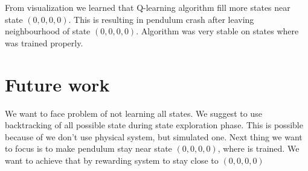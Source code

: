 \documentclass[12pt,a4paper]{article}
\begin{document}
From visualization we learned that Q-learning algorithm fill more states near state $(0, 0, 0, 0)$. This is resulting in pendulum crash after leaving neighbourhood of state $(0, 0, 0, 0)$. Algorithm was very stable on states where was trained properly. 


\section{Future work}

We want to face problem of not learning all states. We suggest to use backtracking of all possible state during state exploration phase. This is possible because of we don't use physical system, but simulated one. Next thing we want to focus is to make pendulum stay near state $(0, 0, 0, 0)$, where is trained. We want to achieve that by rewarding system to stay close to $(0, 0, 0, 0)$



\end{document}
